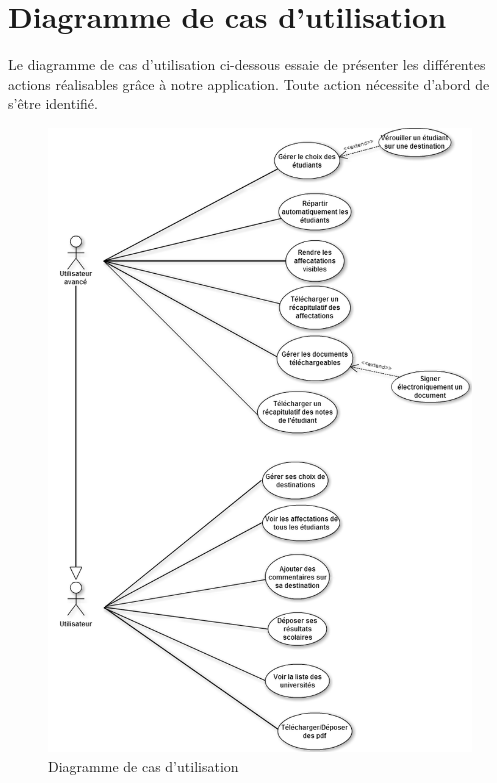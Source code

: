\section{Diagramme de cas d'utilisation}

Le diagramme de cas d'utilisation ci-dessous essaie de présenter les différentes actions réalisables grâce à notre application. Toute action nécessite d'abord de s'être identifié.
\newline
\begin{figure}
	\includegraphics[scale=0.4]{Projet/useCaseDiag/useCaseDiagram.png}
	\caption{Diagramme de cas d'utilisation}
	\label{useCase}
\end{figure}


